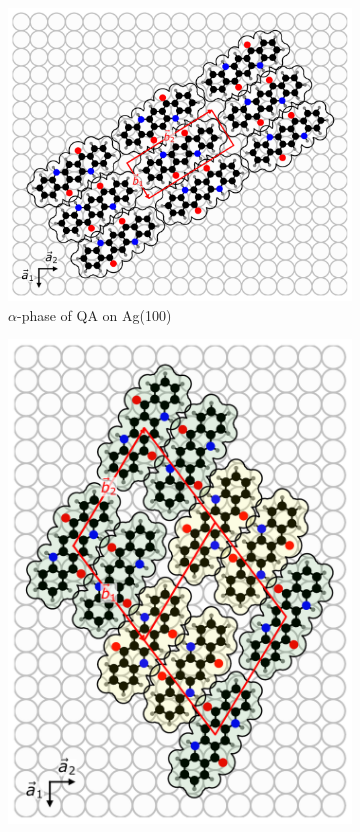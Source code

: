 \begin{figure}[htbp]
	\centering
	\begin{subfigure}[b]{0.49\linewidth}
		\centering
		\includegraphics[width=\linewidth]{images/QA-alpha-Ag(100).pdf}
		\caption{$\alpha$-phase of \ac{QA} on Ag(100)}
	\end{subfigure}
	\hfill
	\begin{subfigure}[b]{0.49\linewidth}
		\centering
		\includegraphics[width=\linewidth]{images/QA-beta-Ag(100).pdf}

\end{subfigure}
\end{figure}
